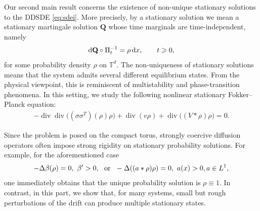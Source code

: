 \documentclass[UTF-8,reqno]{amsart}
\numberwithin{equation}{section}
\theoremstyle{definition}
\def\dif{{\mathord{{\rm d}}}}
\def\geq{\geqslant}
\def\dif{{\mathord{{\rm d}}}}
\def\geq{\geqslant}
\begin{document}
Our second main result concerns the existence of non-unique stationary
solutions to the DDSDE \eqref{eq:sdei}. More precisely, by a stationary
solution we mean a stationary martingale solution $\mathbf Q$ whose  time
marginals are time-independent, namely
\begin{align*}
\dif\mathbf Q\circ \Pi_t^{-1} =\rho\,\dif x,
\qquad
t\geq 0,
\end{align*}
for some probability density $\rho$ on $\mathbb{T}^d$.
The non-uniqueness of stationary solutions means that the system admits several
different equilibrium states. From the physical viewpoint, this is reminiscent
of multistability and phase-transition phenomena.
In this setting, we study the following nonlinear stationary Fokker--Planck
equation:
\begin{align}
-\operatorname{div}\operatorname{div}
\bigl(
(\sigma\sigma^T)(\rho)\rho
\bigr)
+
\operatorname{div}(v\rho)
+
\operatorname{div}\bigl((V*\rho)\rho\bigr)
=
0.
\label{eq:fpe:sta}
\end{align}

Since the problem is posed on the compact torus, strongly coercive diffusion
operators often impose strong rigidity on stationary probability solutions.
For example, for the aforementioned case
\begin{align*}
-\Delta\beta(\rho)=0,\ 
\beta'>0, \ \ {\rm or}\  \ 
-\Delta(
(a*\rho) \rho
)
=
0,\ a(x)>0,a\in L^1,
\end{align*}
one immediately obtains that  the unique
probability solution is $\rho\equiv 1$.  
In contrast, in this part, we show that, for many systems, small but rough perturbations of
the drift can produce multiple stationary states.
\end{document}
